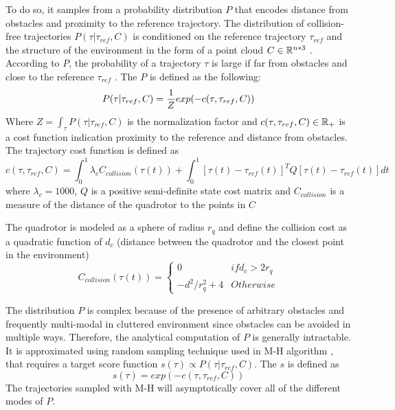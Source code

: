 To do so, it samples from a probability distribution $P$ that encodes distance from obstacles and proximity to the reference trajectory. The distribution of collision-free trajectories $P(\tau | \tau_{ref}, C)$ is conditioned on the reference trajectory $\tau_{ref}$ and the structure of the environment in the form of a point cloud $C \in \mathbb{R}^{n*3}$ . According to $P$, the probability of a trajectory $\tau$ is large if far from obstacles and close to the reference $\tau_{ref}$ . The $P$ is defined as the following:
\begin{equation}
	P(\tau | \tau_{ref},C) = \frac{1}{Z} exp(-c(\tau, \tau_{ref},C)) \\
\end{equation}
Where $	Z = \int_{\tau} P(\tau | \tau_{ref},C)$ is the normalization factor and $c(\tau, \tau_{ref},C) \in \mathbb{R}_+$ is a cost function indication proximity to the reference and distance from obstacles. The trajectory cost function is defined as 
\begin{equation}
	c(\tau, \tau_{ref},C) = \int_0^1 \lambda_c C_{collision}(\tau(t)) + \int_0^1 [\tau(t)-\tau_{ref}(t)]^T Q[\tau(t)-\tau_{ref}(t)]{dt}
	\label{eqn:collision}
\end{equation}
where $\lambda_c = 1000$, $Q$ is a positive semi-definite state cost matrix and $C_{collision}$ is a measure of the distance of the quadrotor to the points in $C$ 

The quadrotor is modeled as a sphere of radius $r_q$ and define the collision cost as a quadratic function of $d_c$ (distance between the quadrotor and the closest point in the environment)
\begin{equation}
	C_{collision}(\tau(t)) = 
	\begin{cases}
		0 & if d_c > 2r_q \\
		-d^2/r_q^2 + 4 & Otherwise
	\end{cases}
\end{equation}

The distribution $P$ is complex because of the presence of arbitrary obstacles and frequently multi-modal in cluttered environment since obstacles can be avoided in multiple ways. Therefore, the analytical computation of $P$ is generally intractable. It is approximated using random sampling technique used in M-H algorithm \cite{MH_hasting}, that requires a target score function $s(\tau) \propto P(\tau | \tau_{ref},C)$. The $s$ is defined as 
\begin{equation}
	s(\tau) = exp(-c(\tau, \tau_{ref},C))
\end{equation}
The trajectories sampled with M-H will asymptotically cover all of the different modes of $P$.


